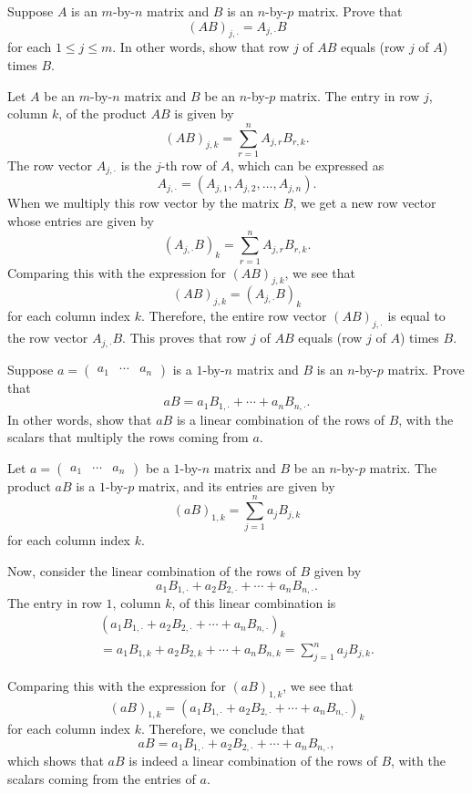 \begin{exercise}
Suppose $A$ is an $m$-by-$n$ matrix and $B$ is an $n$-by-$p$ matrix. Prove
that
\[ (AB)_{j,\cdot} = A_{j,\cdot}B \]
for each $1\le j\le m$. In other words, show that row $j$ of $AB$ equals (row
$j$ of $A$) times $B$.
\end{exercise}
\begin{solution}
Let $A$ be an $m$-by-$n$ matrix and $B$ be an $n$-by-$p$ matrix. The entry in
row $j$, column $k$, of the product $AB$ is given by
\[ (AB)_{j,k} = \sum_{r=1}^n A_{j,r}B_{r,k}. \]
The row vector $A_{j,\cdot}$ is the $j$-th row of $A$, which can be expressed
as
\[ A_{j,\cdot} = (A_{j,1},A_{j,2},\dots,A_{j,n}). \]
When we multiply this row vector by the matrix $B$, we get a new row vector
whose entries are given by
\[ (A_{j,\cdot}B)_k = \sum_{r=1}^n A_{j,r}B_{r,k}. \]
Comparing this with the expression for $(AB)_{j,k}$, we see that
\[ (AB)_{j,k} = (A_{j,\cdot}B)_k \]
for each column index $k$. Therefore, the entire row vector $(AB)_{j,\cdot}$ is
equal to the row vector $A_{j,\cdot}B$. This proves that row $j$ of $AB$ equals
(row $j$ of $A$) times $B$.
\end{solution}

\begin{exercise}
Suppose $a=\begin{pmatrix} a_1 & \cdots & a_n \end{pmatrix}$ is a $1$-by-$n$
matrix and $B$ is an $n$-by-$p$ matrix. Prove that
\[ aB = a_1B_{1,\cdot}+\cdots+a_nB_{n,\cdot}. \]
In other words, show that $aB$ is a linear combination of the rows of $B$, with
the scalars that multiply the rows coming from $a$.
\end{exercise}
\begin{solution}
Let $a=\begin{pmatrix} a_1 & \cdots & a_n \end{pmatrix}$ be a $1$-by-$n$
matrix and $B$ be an $n$-by-$p$ matrix. The product $aB$ is a $1$-by-$p$
matrix, and its entries are given by
\[ (aB)_{1,k} = \sum_{j=1}^n a_jB_{j,k} \]
for each column index $k$.

Now, consider the linear combination of the rows of $B$ given by
\[ a_1B_{1,\cdot}+a_2B_{2,\cdot}+\cdots+a_nB_{n,\cdot}. \]
The entry in row $1$, column $k$, of this linear combination is
\begin{multline*}
(a_1B_{1,\cdot}+a_2B_{2,\cdot}+\cdots+a_nB_{n,\cdot})_k\\
  = a_1B_{1,k}+a_2B_{2,k}+\cdots+a_nB_{n,k} = \sum_{j=1}^n a_jB_{j,k}.
\end{multline*}

Comparing this with the expression for $(aB)_{1,k}$, we see that
\[ (aB)_{1,k} = (a_1B_{1,\cdot}+a_2B_{2,\cdot}+\cdots+a_nB_{n,\cdot})_k \]
for each column index $k$. Therefore, we conclude that
\[ aB = a_1B_{1,\cdot}+a_2B_{2,\cdot}+\cdots+a_nB_{n,\cdot}, \]
which shows that $aB$ is indeed a linear combination of the rows of $B$, with
the scalars coming from the entries of $a$.
\end{solution}

